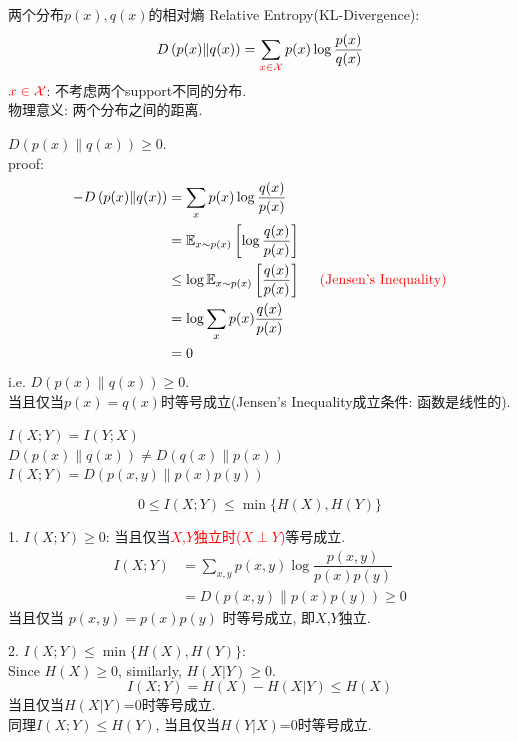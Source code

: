 \begin{definition}
两个分布$p(x),q(x)$的相对熵 Relative Entropy(KL-Divergence):
$$D\left(p(x)\|q(x)\right)=\sum_{\textcolor{red}{x\in\mathcal{X}}}p(x)\log\dfrac{p(x)}{q(x)}$$
$\textcolor{red}{x\in\mathcal{X}}$: 不考虑两个support不同的分布.\\
物理意义: 两个分布之间的距离.
\end{definition}

\begin{proposition}
$D\left(p(x)\|q(x)\right)\geq 0$.\\
proof:
\begin{align*}
-D\left(p(x)\|q(x)\right) &= \sum_{x}p(x)\log\dfrac{q(x)}{p(x)} \\
&= \mathbb{E}_{x\sim p(x)}\left[\log\dfrac{q(x)}{p(x)}\right] \\
&\leq \log\mathbb{E}_{x\sim p(x)}\left[\dfrac{q(x)}{p(x)}\right] \textcolor{red}{\text{\ \ \ \ (Jensen's Inequality)}} \\
&= \log\sum_{x}p(x)\dfrac{q(x)}{p(x)} \\
&= 0
\end{align*}
i.e. $D\left(p(x)\|q(x)\right)\geq 0$.\\
当且仅当$p(x)=q(x)$时等号成立(Jensen's Inequality成立条件: 函数是线性的).
\end{proposition}

\begin{proposition}
$I(X;Y)=I(Y;X)$\\
$D\left(p(x)\|q(x)\right)\neq D\left(q(x)\|p(x)\right)$\\
$I(X;Y)=D\left(p(x,y)\|p(x)p(y)\right)$
\end{proposition}

\begin{proposition}
$$0\leq I(X;Y)\leq \min\{H(X),H(Y)\}$$
\end{proposition}

1. $I(X;Y)\geq 0$: 当且仅当\textcolor{red}{$X$,$Y$独立时($X\perp Y$)}等号成立.
\begin{align*}
I(X;Y) &= \sum_{x,y}p(x,y)\log\dfrac{p(x,y)}{p(x)p(y)} \\
&= D\left(p(x,y)\|p(x)p(y)\right) \geq 0
\end{align*}
当且仅当 $p(x,y)=p(x)p(y)$ 时等号成立, 即$X$,$Y$独立.

2. $I(X;Y)\leq \min\{H(X),H(Y)\}$:\\
Since $H(X)\geq 0$, similarly, $H(X|Y)\geq 0$.
$$I(X;Y) = H(X) - H(X|Y) \leq H(X)$$
当且仅当$H(X|Y)$=0时等号成立.\\
同理$I(X;Y)\leq H(Y)$, 当且仅当$H(Y|X)$=0时等号成立.

